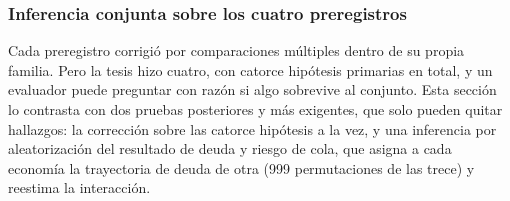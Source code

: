 \subsubsection{Inferencia conjunta sobre los cuatro preregistros}
\label{sec:inferencia-conjunta}

Cada preregistro corrigió por comparaciones múltiples dentro de su propia familia. Pero la tesis hizo cuatro, con catorce hipótesis primarias en total, y un evaluador puede preguntar con razón si algo sobrevive al conjunto. Esta sección lo contrasta con dos pruebas posteriores y más exigentes, que solo pueden quitar hallazgos: la corrección sobre las catorce hipótesis a la vez, y una inferencia por aleatorización del resultado de deuda y riesgo de cola, que asigna a cada economía la trayectoria de deuda de otra (999 permutaciones de las trece) y reestima la interacción.

